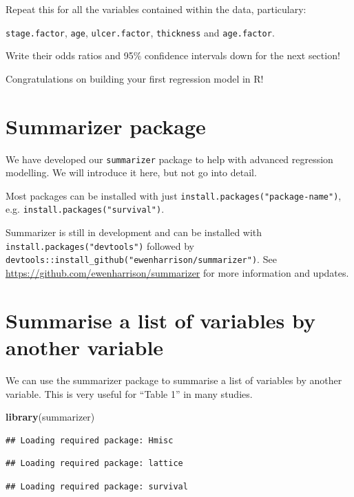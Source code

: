 \documentclass[]{book}
\makeatletter
\newenvironment{Shaded}{\begin{snugshade}}{\end{snugshade}}
\newcommand{\KeywordTok}[1]{\textcolor[rgb]{0.13,0.29,0.53}{\textbf{#1}}}
\newcommand{\NormalTok}[1]{#1}
\newenvironment{kframe}{%
\medskip{}
\setlength{\fboxsep}{.8em}
 \def\at@end@of@kframe{}%
 \ifinner\ifhmode%
  \def\at@end@of@kframe{\end{minipage}}%
  \begin{minipage}{\columnwidth}%
 \fi\fi%
 \def\FrameCommand##1{\hskip\@totalleftmargin \hskip-\fboxsep
 \colorbox{shadecolor}{##1}\hskip-\fboxsep
     \hskip-\linewidth \hskip-\@totalleftmargin \hskip\columnwidth}%
 \MakeFramed {\advance\hsize-\width
   \@totalleftmargin\z@ \linewidth\hsize
   \@setminipage}}%
 {\par\unskip\endMakeFramed%
 \at@end@of@kframe}
\renewenvironment{Shaded}{\begin{kframe}}{\end{kframe}}
\makeatother
\begin{document}
Repeat this for all the variables contained within the data,
particulary:

\texttt{stage.factor}, \texttt{age}, \texttt{ulcer.factor},
\texttt{thickness} and \texttt{age.factor}.

Write their odds ratios and 95\% confidence intervals down for the next
section!

Congratulations on building your first regression model in R!

\section{Summarizer package}\label{summarizer-package}

We have developed our \texttt{summarizer} package to help with advanced
regression modelling. We will introduce it here, but not go into detail.

Most packages can be installed with just
\texttt{install.packages("package-name")}, e.g.
\texttt{install.packages("survival")}.

Summarizer is still in development and can be installed with
\texttt{install.packages("devtools")} followed by
\texttt{devtools::install\_github("ewenharrison/summarizer")}. See
\url{https://github.com/ewenharrison/summarizer} for more information
and updates.

\section{Summarise a list of variables by another
variable}\label{summarise-a-list-of-variables-by-another-variable}

We can use the summarizer package to summarise a list of variables by
another variable. This is very useful for ``Table 1'' in many studies.

\begin{Shaded}
\begin{Highlighting}[]
\KeywordTok{library}\NormalTok{(summarizer)}
\end{Highlighting}
\end{Shaded}

\begin{verbatim}
## Loading required package: Hmisc
\end{verbatim}

\begin{verbatim}
## Loading required package: lattice
\end{verbatim}

\begin{verbatim}
## Loading required package: survival
\end{verbatim}
\end{document}
